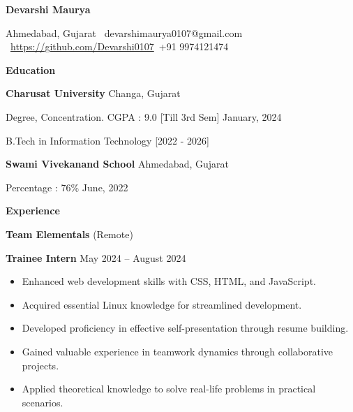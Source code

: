 \documentclass[11pt]{article}
\begin{document}
\begin{center}
    \textbf{Devarshi Maurya}\\ 
    \hrulefill
\end{center}

\begin{center}
    Ahmedabad, Gujarat \textbullet \ devarshimaurya0107@gmail.com \textbullet \  \url{https://github.com/Devarshi0107}\textbullet \ +91 9974121474
\end{center}

\vspace{0.5pt}

\begin{center}
    \textbf{Education}
\end{center}
\textbf{Charusat University} \hfill Changa, Gujarat

Degree, Concentration. CGPA : 9.0 [Till 3rd Sem] \hfill January, 2024

B.Tech in Information Technology    [2022 - 2026]

\vspace{12pt}

\textbf{Swami Vivekanand School} \hfill	Ahmedabad, Gujarat

Percentage : 76\%
\hfill June, 2022 

\vspace{12pt}

\begin{center}
    \textbf{Experience}
\end{center}
\textbf{Team Elementals} \hfill (Remote)

\textbf{Trainee Intern} \hfill May 2024 – August 2024
\begin{itemize}[noitemsep, topsep=0pt, partopsep=0pt, parsep=0pt]
   \item Enhanced web development skills with CSS, HTML, and JavaScript.
    \item Acquired essential Linux knowledge for streamlined development.
    \item Developed proficiency in effective self-presentation through resume building.
    \item Gained valuable experience in teamwork dynamics through collaborative projects.
    \item Applied theoretical knowledge to solve real-life problems in practical scenarios.
\end{itemize}

\vspace{12pt}
\end{document}
